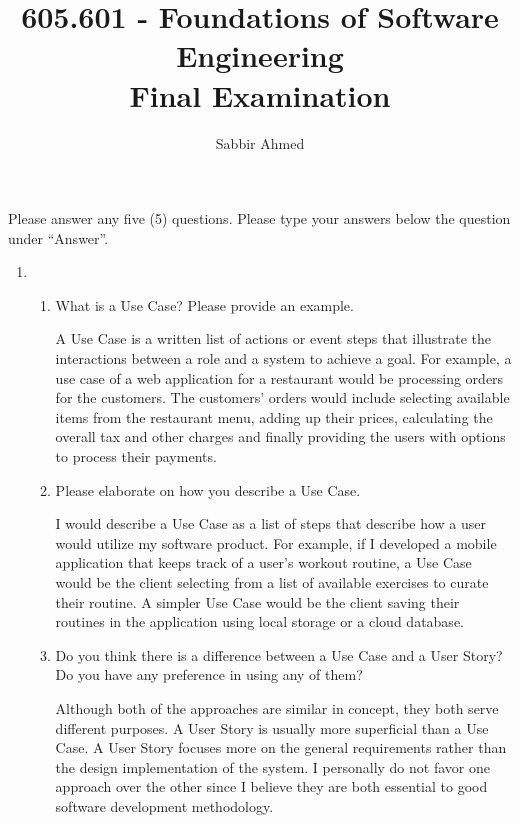 \documentclass[12pt]{article}
\begin{document}
  \title{605.601 - Foundations of Software Engineering \\ Final Examination\vspace{-0.5em}}
  \author{Sabbir Ahmed}
  \maketitle
  \vspace{-5em}

  \section*{} Please answer any five (5) questions. Please type your answers below the question under ``Answer''.

  \begin{enumerate}

    \item
    \begin{enumerate}[start=1,align=left]
      \item What is a Use Case? Please provide an example.

      A Use Case is a written list of actions or event steps that illustrate the interactions between a role and a system to achieve a goal. For example, a use case of a web application for a restaurant would be processing orders for the customers. The customers' orders would include selecting available items from the restaurant menu, adding up their prices, calculating the overall tax and other charges and finally providing the users with options to process their payments.

      \item Please elaborate on how you describe a Use Case.

      I would describe a Use Case as a list of steps that describe how a user would utilize my software product. For example, if I developed a mobile application that keeps track of a user's workout routine, a Use Case would be the client selecting from a list of available exercises to curate their routine. A simpler Use Case would be the client saving their routines in the application using local storage or a cloud database.

      \item Do you think there is a difference between a Use Case and a User Story? Do you have any preference in using any of them?

      Although both of the approaches are similar in concept, they both serve different purposes. A User Story is usually more superficial than a Use Case. A User Story focuses more on the general requirements rather than the design implementation of the system. I personally do not favor one approach over the other since I believe they are both essential to good software development methodology.


\end{enumerate}
\end{enumerate}
\end{document}
